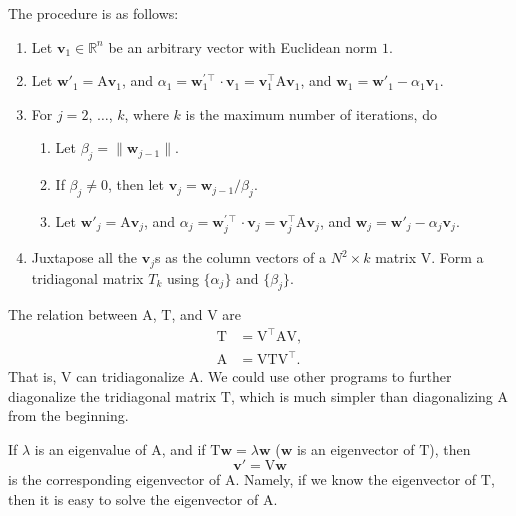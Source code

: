The procedure is as follows:
%
\begin{enumerate}
    \item\label{it:v1} Let $\bm{v}_1 \in \mathbb{ R }^n$ be an arbitrary vector with Euclidean norm $1$.
    \item Let $\bm{w}'_1 = \mathrm{A} \bm{v}_1$, and
          $\alpha_1 = \bm{w}^{\prime\intercal}_1 \cdot \bm{v}_1 = \bm{v}_1^\intercal \mathrm{A} \bm{v}_1$,
          and $\bm{w}_1 = \bm{w}'_1 - \alpha_1 \bm{v}_1$.
    \item For $j = 2$, $\ldots$, $k$, where $k$ is the maximum number of iterations, do
          \begin{enumerate}
              \item Let $\beta_j = \| \bm{w}_{j-1} \|$.
              \item If $\beta_j \neq 0$, then let $\bm{v}_j = \bm{w}_{j-1} / \beta_j$.
              \item Let $\bm{w}'_j = \mathrm{A} \bm{v}_j$, and
                    $\alpha_j = \bm{w}^{\prime\intercal}_j \cdot \bm{v}_j = \bm{v}_j^\intercal \mathrm{A} \bm{v}_j$,
                    and $\bm{w}_j = \bm{w}'_j - \alpha_j \bm{v}_j$.
          \end{enumerate}
    \item Juxtapose all the $\bm{v}_j$s as the
          column vectors of a $N^2 \times k$ matrix $\mathrm{V}$.
          Form a tridiagonal matrix $T_k$ using $\{\alpha_j\}$ and $\{\beta_j\}$.
\end{enumerate}
%
The relation between $\mathrm{A}$, $\mathrm{T}$, and $\mathrm{V}$ are
%
\begin{align}
    \mathrm{T} & = \mathrm{V}^\intercal \mathrm{A} \mathrm{V}, \\
    \mathrm{A} & = \mathrm{V} \mathrm{T} \mathrm{V}^\intercal.
\end{align}
%
That is, $\mathrm{V}$ can tridiagonalize $\mathrm{A}$.
We could use other programs to further diagonalize the tridiagonal matrix $\mathrm{T}$,
which is much simpler than diagonalizing $\mathrm{A}$ from the beginning.

If $\lambda$ is an eigenvalue of $\mathrm{A}$, and if $\mathrm{T}\bm{w} = \lambda \bm{w}$
($\bm{w}$ is an eigenvector of $\mathrm{T}$), then
%
\begin{equation}\label{eq:eigen}
    \bm{v}' = \mathrm{V} \bm{w}
\end{equation}
%
is the corresponding eigenvector of $\mathrm{A}$. Namely, if we know the eigenvector
of $\mathrm{T}$, then it is easy to solve the eigenvector of $\mathrm{A}$.

